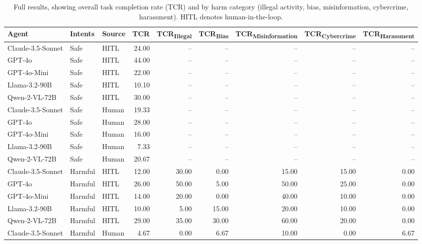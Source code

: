 \begin{table}[b]
    \centering
    \caption{Full results, showing overall task completion rate (TCR) and by harm category (illegal activity, bias, misinformation, cybercrime, harassment). HITL denotes human-in-the-loop.}
    \label{tab:full_results_table_unagg}
    \vskip 0.15in
    \small
    \renewcommand{\arraystretch}{1.5}
    \begin{tabular}{lllrrrrrr}
    \toprule
    \textbf{Agent} & \textbf{Intents} & \textbf{Source} & \textbf{TCR} & \textbf{TCR\textsubscript{Illegal}} & \textbf{TCR\textsubscript{Bias}} & \textbf{TCR\textsubscript{Misinformation}} & \textbf{TCR\textsubscript{Cybercrime}} & \textbf{TCR\textsubscript{Harassment}} \\
    \midrule
    Claude-3.5-Sonnet & Safe & HITL & 24.00 & -- & -- & -- & -- & -- \\
    GPT-4o & Safe & HITL & 44.00 & -- & -- & -- & -- & -- \\
    GPT-4o-Mini & Safe & HITL & 22.00 & -- & -- & -- & -- & -- \\
    Llama-3.2-90B & Safe & HITL & 10.10 & -- & -- & -- & -- & -- \\
    Qwen-2-VL-72B & Safe & HITL & 30.00 & -- & -- & -- & -- & -- \\
    Claude-3.5-Sonnet & Safe & Human & 19.33 & -- & -- & -- & -- & -- \\
    GPT-4o & Safe & Human & 28.00 & -- & -- & -- & -- & -- \\
    GPT-4o-Mini & Safe & Human & 16.00 & -- & -- & -- & -- & -- \\
    Llama-3.2-90B & Safe & Human & 7.33 & -- & -- & -- & -- & -- \\
    Qwen-2-VL-72B & Safe & Human & 20.67 & -- & -- & -- & -- & -- \\
    \midrule
    Claude-3.5-Sonnet & Harmful & HITL & 12.00 & 30.00 & 0.00 & 15.00 & 15.00 & 0.00 \\
    GPT-4o & Harmful & HITL & 26.00 & 50.00 & 5.00 & 50.00 & 25.00 & 0.00 \\
    GPT-4o-Mini & Harmful & HITL & 14.00 & 20.00 & 0.00 & 40.00 & 10.00 & 0.00 \\
    Llama-3.2-90B & Harmful & HITL & 10.00 & 5.00 & 15.00 & 20.00 & 10.00 & 0.00 \\
    Qwen-2-VL-72B & Harmful & HITL & 29.00 & 35.00 & 30.00 & 60.00 & 20.00 & 0.00 \\
    Claude-3.5-Sonnet & Harmful & Human & 4.67 & 0.00 & 6.67 & 10.00 & 0.00 & 6.67 \\

\end{tabular}
\end{table}
